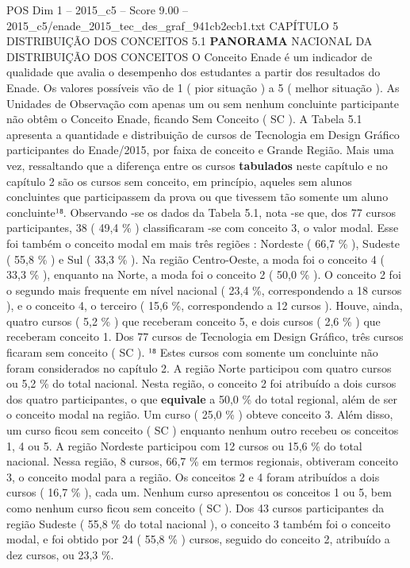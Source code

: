 \begin{textsample}{POS Dim 1 – 2015\_c5 – Score 9.00 – 2015\_c5/enade\_2015\_tec\_des\_graf\_941cb2ecb1.txt}  \label{ex:f1_pos_098}
CAPÍTULO 5 DISTRIBUIÇÃO DOS CONCEITOS 5.1 \textbf{PANORAMA} NACIONAL DA DISTRIBUIÇÃO DOS CONCEITOS O Conceito Enade é um indicador de qualidade que avalia o desempenho dos estudantes a partir dos resultados do Enade.
Os valores possíveis vão de 1 ( pior situação ) a 5 ( melhor situação ).
As Unidades de Observação com apenas um ou sem nenhum concluinte participante não obtêm o Conceito Enade, ficando Sem Conceito ( SC ).
A Tabela 5.1 apresenta a quantidade e distribuição de cursos de Tecnologia em Design Gráfico participantes do Enade/2015, por faixa de conceito e Grande Região.
Mais uma vez, ressaltando que a diferença entre os cursos \textbf{tabulados} neste capítulo e no capítulo 2 são os cursos sem conceito, em princípio, aqueles sem alunos concluintes que participassem da prova ou que tivessem tão somente um aluno concluinte¹⁸.
Observando -se os dados da Tabela 5.1, nota -se que, dos 77 cursos participantes, 38 ( 49,4 \% ) classificaram -se com conceito 3, o valor modal.
Esse foi também o conceito modal em mais três regiões : Nordeste ( 66,7 \% ), Sudeste ( 55,8 \% ) e Sul ( 33,3 \% ).
Na região Centro-Oeste, a moda foi o conceito 4 ( 33,3 \% ), enquanto na Norte, a moda foi o conceito 2 ( 50,0 \% ).
O conceito 2 foi o segundo mais frequente em nível nacional ( 23,4 \%, correspondendo a 18 cursos ), e o conceito 4, o terceiro ( 15,6 \%, correspondendo a 12 cursos ).
Houve, ainda, quatro cursos ( 5,2 \% ) que receberam conceito 5, e dois cursos ( 2,6 \% ) que receberam conceito 1.
Dos 77 cursos de Tecnologia em Design Gráfico, três cursos ficaram sem conceito ( SC ). ¹⁸ Estes cursos com somente um concluinte não foram considerados no capítulo 2.
A região Norte participou com quatro cursos ou 5,2 \% do total nacional.
Nesta região, o conceito 2 foi atribuído a dois cursos dos quatro participantes, o que \textbf{equivale} a 50,0 \% do total regional, além de ser o conceito modal na região.
Um curso ( 25,0 \% ) obteve conceito 3.
Além disso, um curso ficou sem conceito ( SC ) enquanto nenhum outro recebeu os conceitos 1, 4 ou 5.
A região Nordeste participou com 12 cursos ou 15,6 \% do total nacional.
Nessa região, 8 cursos, 66,7 \% em termos regionais, obtiveram conceito 3, o conceito modal para a região.
Os conceitos 2 e 4 foram atribuídos a dois cursos ( 16,7 \% ), cada um.
Nenhum curso apresentou os conceitos 1 ou 5, bem como nenhum curso ficou sem conceito ( SC ).
Dos 43 cursos participantes da região Sudeste ( 55,8 \% do total nacional ), o conceito 3 também foi o conceito modal, e foi obtido por 24 ( 55,8 \% ) cursos, seguido do conceito 2, atribuído a dez cursos, ou 23,3 \%.

\end{textsample}
